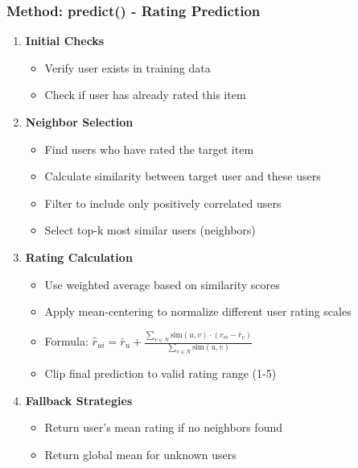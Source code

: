 \documentclass{beamer}
\begin{document}
\begin{frame}
\frametitle{Method: predict() - Rating Prediction}

\begin{enumerate}
    \item \textbf{Initial Checks}
    \begin{itemize}
        \item Verify user exists in training data
        \item Check if user has already rated this item
    \end{itemize}
    
    \item \textbf{Neighbor Selection}
    \begin{itemize}
        \item Find users who have rated the target item
        \item Calculate similarity between target user and these users
        \item Filter to include only positively correlated users
        \item Select top-k most similar users (neighbors)
    \end{itemize}
    
    \item \textbf{Rating Calculation}
    \begin{itemize}
        \item Use weighted average based on similarity scores
        \item Apply mean-centering to normalize different user rating scales
        \item Formula: $\hat{r}_{ui} = \bar{r}_u + \frac{\sum_{v \in N} \text{sim}(u,v) \cdot (r_{vi} - \bar{r}_v)}{\sum_{v \in N} \text{sim}(u,v)}$
        \item Clip final prediction to valid rating range (1-5)
    \end{itemize}
    
    \item \textbf{Fallback Strategies}
    \begin{itemize}
        \item Return user's mean rating if no neighbors found
        \item Return global mean for unknown users
    \end{itemize}
\end{enumerate}
\end{frame}
\end{document}
